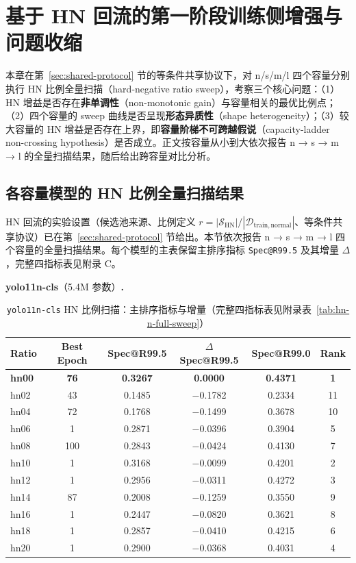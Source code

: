 \documentclass[UTF8,openany,12pt]{ctexbook}
\newcommand{\formalmetric}[1]{\texttt{#1}}
\begin{document}
\chapter{基于 HN 回流的第一阶段训练侧增强与问题收缩}

\noindent 本章在第~\ref{sec:shared-protocol} 节的等条件共享协议下，对 n/s/m/l 四个容量分别执行 HN 比例全量扫描（hard-negative ratio sweep），考察三个核心问题：（1）HN 增益是否存在\textbf{非单调性}（non-monotonic gain）与容量相关的最优比例点；（2）四个容量的 sweep 曲线是否呈现\textbf{形态异质性}（shape heterogeneity）；（3）较大容量的 HN 增益是否存在上界，即\textbf{容量阶梯不可跨越假说}（capacity-ladder non-crossing hypothesis）是否成立。正文按容量从小到大依次报告 n → s → m → l 的全量扫描结果，随后给出跨容量对比分析。

\section{各容量模型的 HN 比例全量扫描结果}

HN 回流的实验设置（候选池来源、比例定义 $r = |\mathcal{S}_\mathrm{HN}| / |\mathcal{D}_\mathrm{train,normal}|$、等条件共享协议）已在第~\ref{sec:shared-protocol} 节给出。本节依次报告 n → s → m → l 四个容量的全量扫描结果。每个模型的主表保留主排序指标 \formalmetric{Spec@R99.5} 及其增量 $\Delta$，完整四指标表见附录 C。

\medskip
\noindent\textbf{yolo11n-cls}（5.4M 参数）\textbf{.}

\begin{table}[H]
    \centering
    \caption{\texttt{yolo11n-cls} HN 比例扫描：主排序指标与增量（完整四指标表见附录表~\ref{tab:hn-n-full-sweep}）}
    \label{tab:hn-n-main-ranking}
    \begin{tabular}{lccccc}
        \toprule
        Ratio & Best Epoch & Spec@R99.5 & $\Delta$Spec@R99.5 & Spec@R99.0 & Rank \\
        \midrule
        \textbf{hn00} & \textbf{76}  & \textbf{0.3267} & \textbf{0.0000}  & \textbf{0.4371} & \textbf{1} \\
        hn02 & 43  & 0.1485 & $-$0.1782 & 0.2334 & 11 \\
        hn04 & 72  & 0.1768 & $-$0.1499 & 0.3678 & 10 \\
        hn06 & 1   & 0.2871 & $-$0.0396 & 0.3904 & 5 \\
        hn08 & 100 & 0.2843 & $-$0.0424 & 0.4130 & 7 \\
        hn10 & 1   & 0.3168 & $-$0.0099 & 0.4201 & 2 \\
        hn12 & 1   & 0.2956 & $-$0.0311 & 0.4272 & 3 \\
        hn14 & 87  & 0.2008 & $-$0.1259 & 0.3550 & 9 \\
        hn16 & 1   & 0.2447 & $-$0.0820 & 0.3621 & 8 \\
        hn18 & 1   & 0.2857 & $-$0.0410 & 0.4215 & 6 \\
        hn20 & 1   & 0.2900 & $-$0.0368 & 0.4031 & 4 \\
        \bottomrule
    \end{tabular}
\end{table}
\end{document}
